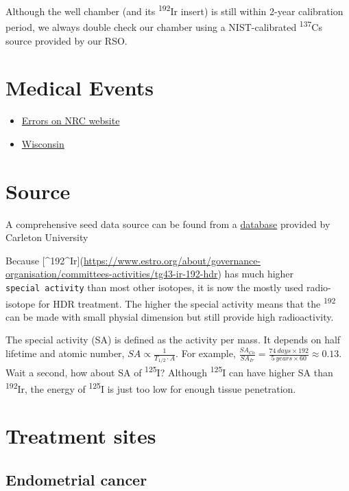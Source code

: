 \documentclass[]{book}
\providecommand{\tightlist}{%
  \setlength{\itemsep}{0pt}\setlength{\parskip}{0pt}}
\theoremstyle{definition}
\theoremstyle{definition}
\theoremstyle{definition}
\theoremstyle{remark}
\begin{document}
Although the well chamber (and its \textsuperscript{192}Ir insert) is
still within 2-year calibration period, we always double check our
chamber using a NIST-calibrated \textsuperscript{137}Cs source provided
by our RSO.

\section{Medical Events}\label{medical-events}

\begin{itemize}
\tightlist
\item
  \href{http://www.nrc.gov/reading-rm/doccollections/nuregs/brochures/br0117/}{Errors
  on NRC website}
\item
  \href{(http://chapter.aapm.org/GLC/media/2011/tollenaar.pdf)}{Wisconsin}
\end{itemize}

\section{Source}\label{source}

A comprehensive seed data source can be found from a
\href{http://www.physics.carleton.ca/clrp/seed_database}{database}
provided by Carleton University

Because
{[}\^{}192\^{}Ir{]}(\url{https://www.estro.org/about/governance-organisation/committees-activities/tg43-ir-192-hdr})
has much higher \texttt{special\ activity} than most other isotopes, it
is now the mostly used radio-isotope for HDR treatment. The higher the
special activity means that the \textsuperscript{192} can be made with
small physial dimension but still provide high radioactivity.

The special activity (SA) is defined as the activity per mass. It
depends on half lifetime and atomic number,
\(SA \propto \frac{1}{T_{1/2}\cdot A}\). For example,
\(\frac{SA_{Co}}{SA_{Ir}} = \frac{74\ days \times 192}{5\ years \times 60} \approx 0.13\).
Wait a second, how about SA of \textsuperscript{125}I? Although
\textsuperscript{125}I can have higher SA than \textsuperscript{192}Ir,
the energy of \textsuperscript{125}I is just too low for enough tissue
penetration.

\section{Treatment sites}\label{treatment-sites-1}

\subsection{Endometrial cancer}\label{endometrial-cancer}
\end{document}

